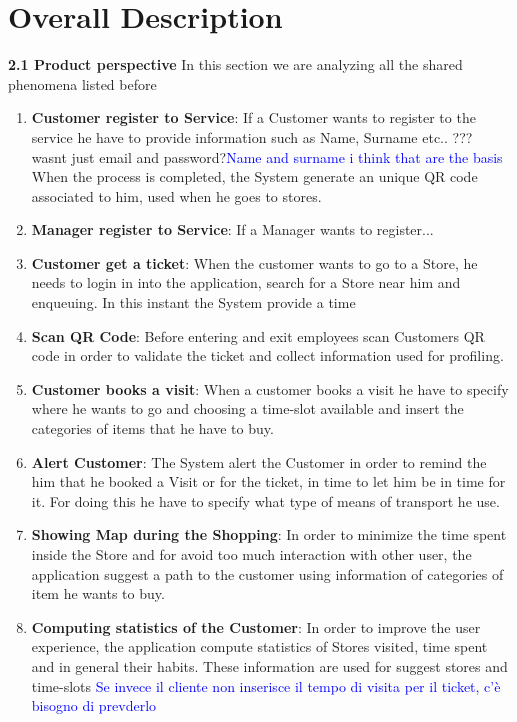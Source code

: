 \documentclass[a4paper, 10pt, oneside]{article}
\newcommand*{\lorenzo}[1]{\textcolor{BurntOrange}{#1}}
\newcommand{\giovanni}[1]{\textcolor{Blue}{#1}}
\begin{document}
\section{Overall Description}
\label{overallDescription}
{\large \textbf{2.1 Product perspective}}
\newline\newline
In this section we are analyzing all the shared phenomena listed before
\begin{enumerate}
\item \textbf{Customer register to Service}: If a Customer wants to register to the service he have to provide information such as Name, Surname etc.. \lorenzo{??? wasnt just email and password?}\giovanni{Name and surname i think that are the basis}
When the process is completed, the System generate an unique QR code associated to him, used when he goes to stores.

\item \textbf{Manager register to Service}: If a Manager wants to register...

\item \textbf{Customer get a ticket}: When the customer wants to go to a Store, he needs to login in into the application, search for a Store near him and enqueuing. In this instant the System provide a time 

\item \textbf{Scan QR Code}: Before entering and exit employees scan Customers QR code in order to validate the ticket and collect information used for profiling.

\item \textbf{Customer books a visit}: When a customer books a visit he have to specify where he wants to go and choosing a time-slot available and insert the categories of items that he have to buy. 

\item \textbf{Alert Customer}: The System alert the Customer in order to remind the him that he booked a Visit or for the ticket, in time to let him be in time for it.
For doing this he have to specify what type of means of transport he use.

\item \textbf{Showing Map during the Shopping}: In order to minimize the time spent inside the Store
and for avoid too much interaction with other user, the application suggest a path to the customer using information of categories of item he wants to buy.

\item \textbf{Computing statistics of the Customer}: In order to improve the user experience, the application compute statistics of Stores visited, time spent and in general their habits. These information are used for suggest stores and time-slots \giovanni{Se invece il cliente non inserisce il tempo di visita per il ticket, c'è bisogno di prevderlo}
\end{enumerate}
\end{document}
